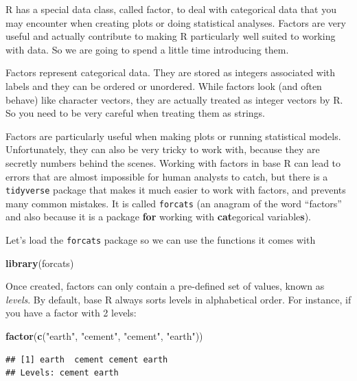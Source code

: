 \documentclass[]{book}
\newenvironment{Shaded}{\begin{snugshade}}{\end{snugshade}}
\newcommand{\KeywordTok}[1]{\textcolor[rgb]{0.13,0.29,0.53}{\textbf{#1}}}
\newcommand{\StringTok}[1]{\textcolor[rgb]{0.31,0.60,0.02}{#1}}
\newcommand{\NormalTok}[1]{#1}
\begin{document}
R has a special data class, called factor, to deal with categorical data
that you may encounter when creating plots or doing statistical
analyses. Factors are very useful and actually contribute to making R
particularly well suited to working with data. So we are going to spend
a little time introducing them.

Factors represent categorical data. They are stored as integers
associated with labels and they can be ordered or unordered. While
factors look (and often behave) like character vectors, they are
actually treated as integer vectors by R. So you need to be very careful
when treating them as strings.

Factors are particularly useful when making plots or running statistical
models. Unfortunately, they can also be very tricky to work with,
because they are secretly numbers behind the scenes. Working with
factors in base R can lead to errors that are almost impossible for
human analysts to catch, but there is a \texttt{tidyverse} package that
makes it much easier to work with factors, and prevents many common
mistakes. It is called \texttt{forcats} (an anagram of the word
``factors'' and also because it is a package \textbf{for} working with
\textbf{cat}egorical variable\textbf{s}).

Let's load the \texttt{forcats} package so we can use the functions it
comes with

\begin{Shaded}
\begin{Highlighting}[]
\KeywordTok{library}\NormalTok{(forcats)}
\end{Highlighting}
\end{Shaded}

Once created, factors can only contain a pre-defined set of values,
known as \emph{levels}. By default, base R always sorts levels in
alphabetical order. For instance, if you have a factor with 2 levels:

\begin{Shaded}
\begin{Highlighting}[]
\KeywordTok{factor}\NormalTok{(}\KeywordTok{c}\NormalTok{(}\StringTok{"earth"}\NormalTok{, }\StringTok{"cement"}\NormalTok{, }\StringTok{"cement"}\NormalTok{, }\StringTok{"earth"}\NormalTok{))}
\end{Highlighting}
\end{Shaded}

\begin{verbatim}
## [1] earth  cement cement earth 
## Levels: cement earth
\end{verbatim}
\end{document}
